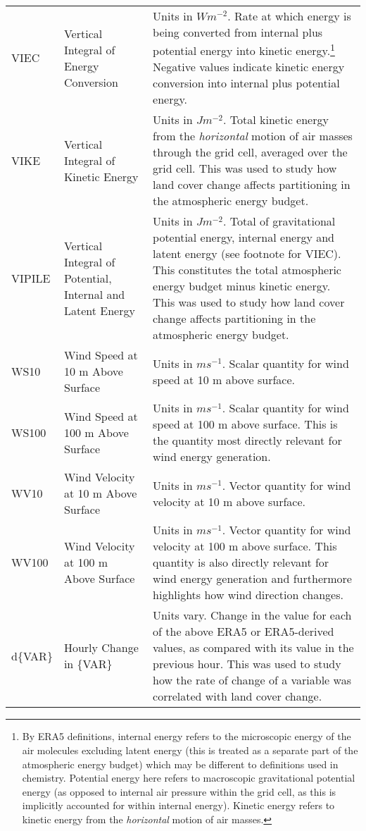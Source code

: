 \begin{landscape}
\begin{longtable}{P{2cm}P{3cm}P{15cm}}
			VIEC & Vertical Integral of Energy Conversion & Units in $W m^{-2}$. Rate at which energy is being converted from internal plus potential energy into kinetic energy.\footnote{By ERA5 definitions, internal energy refers to the microscopic energy of the air molecules excluding latent energy (this is treated as a separate part of the atmospheric energy budget) which may be different to definitions used in chemistry. Potential energy here refers to macroscopic gravitational potential energy (as opposed to internal air pressure within the grid cell, as this is implicitly accounted for within internal energy). Kinetic energy refers to kinetic energy from the \textit{horizontal} motion of air masses.} Negative values indicate kinetic energy conversion into internal plus potential energy. \\
			VIKE & Vertical Integral of Kinetic Energy & Units in $J m^{-2}$. Total kinetic energy from the \textit{horizontal} motion of air masses through the grid cell, averaged over the grid cell. This was used to study how land cover change affects partitioning in the atmospheric energy budget. \\
			VIPILE & Vertical Integral of Potential, Internal and Latent Energy & Units in $J m^{-2}$. Total of gravitational potential energy, internal energy and latent energy (see footnote for VIEC). This constitutes the total atmospheric energy budget minus kinetic energy. This was used to study how land cover change affects partitioning in the atmospheric energy budget. \\
			WS10 & Wind Speed at 10 m Above Surface & Units in $m s^{-1}$. Scalar quantity for wind speed at 10 m above surface. \\
			WS100 & Wind Speed at 100 m Above Surface & Units in $m s^{-1}$. Scalar quantity for wind speed at 100 m above surface. This is the quantity most directly relevant for wind energy generation. \\
			WV10 & Wind Velocity at 10 m Above Surface & Units in $m s^{-1}$. Vector quantity for wind velocity at 10 m above surface. \\
			WV100 & Wind Velocity at 100 m Above Surface & Units in $m s^{-1}$. Vector quantity for wind velocity at 100 m above surface. This quantity is also directly relevant for wind energy generation and furthermore highlights how wind direction changes. \\ \midrule
			d\{VAR\} & Hourly Change in \{VAR\} & Units vary. Change in the value for each of the above ERA5 or ERA5-derived values, as compared with its value in the previous hour. This was used to study how the rate of change of a variable was correlated with land cover change. \\ \midrule

\end{longtable}
\end{landscape}
